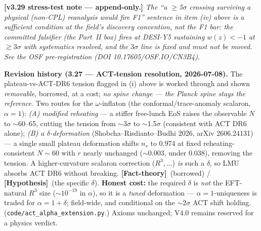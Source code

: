 \documentclass[11pt]{article}
\newcommand{\factth}{\textcolor{green!40!black}{\textbf{[Fact-theory]}}}
\newcommand{\hyp}{\textcolor{orange!80!black}{\textbf{[Hypothesis]}}}
\begin{document}
{\smallskip\noindent\textbf{[v3.29 stress-test note --- append-only.]} \emph{The ``a $\ge$5$\sigma$ crossing surviving a physical (non-CPL) reanalysis would fire F1'' sentence in item (iv) above is a sufficient condition at the field's discovery convention, not the F1 bar: the committed falsifier (the Part~II box) fires at DESI-Y5 sustaining $w(z)<-1$ at $\gtrsim3\sigma$ \emph{with systematics resolved}, and the $3\sigma$ line is fixed and must not be moved. See the OSF pre-registration (DOI 10.17605/OSF.IO/CN3B4).}

\smallskip\noindent\textbf{Revision history (3.27 --- ACT-tension resolution, 2026-07-08).} The plateau-vs-ACT-DR6 tension flagged in (i) above is worked through and shown \emph{removable}, borrowed, at a cost; \emph{no spine change --- the Planck spine stays the reference}. Two routes for the $\omega$-inflaton (the conformal/trace-anomaly scalaron, $\alpha{=}1$): \emph{(A) modified reheating} --- a stiffer free-lunch EoS raises the observable $N$ to $\sim$60--65, cutting the tension from $\sim$3$\sigma$ to $\sim$1.5$\sigma$ (consistent with ACT DR6 alone); \emph{(B) a $\delta$-deformation} (Shobcha--Risdianto--Budhi 2026, arXiv 2606.24131) --- a single small plateau deformation shifts $n_s$ to 0.974 at fixed reheating-consistent $N\!\sim\!60$ with $r$ nearly unchanged ($\sim$0.003, under 0.038), removing the tension. A higher-curvature scalaron correction ($R^3,\dots$) \emph{is} such a $\delta$, so LMU absorbs ACT DR6 without breaking. \factth\ (borrowed) / \hyp\ (the specific $\delta$). \textbf{Honest cost:} the required $\delta$ is \emph{not} the EFT-natural $R^3$ size ($\sim$$10^{-19}$ in $\alpha$), so it is a \emph{tuned} deformation --- $\alpha{=}1$-uniqueness is traded for $\alpha{=}1+\delta$; field-wide, and conditional on the $\sim$2$\sigma$ ACT shift holding. (\texttt{code/act\_alpha\_extension.py}.) Axioms unchanged; V4.0 remains reserved for a physics verdict.

}
\end{document}
